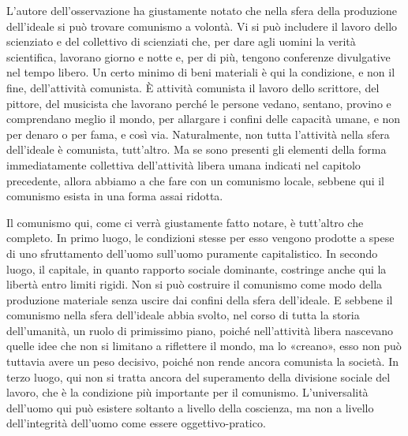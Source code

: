 \documentclass[12pt,a4paper,openany]{book}
\begin{document}
L'autore dell'osservazione ha giustamente notato che nella sfera della produzione dell'ideale si può trovare comunismo a volontà. Vi si può includere il lavoro dello scienziato e del collettivo di scienziati che, per dare agli uomini la verità scientifica, lavorano giorno e notte e, per di più, tengono conferenze divulgative nel tempo libero. Un certo minimo di beni materiali è qui la condizione, e non il fine, dell'attività comunista. È attività comunista il lavoro dello scrittore, del pittore, del musicista che lavorano perché le persone vedano, sentano, provino e comprendano meglio il mondo, per allargare i confini delle capacità umane, e non per denaro o per fama, e così via. Naturalmente, non tutta l'attività nella sfera dell'ideale è comunista, tutt'altro. Ma se sono presenti gli elementi della forma immediatamente collettiva dell'attività libera umana indicati nel capitolo precedente, allora abbiamo a che fare con un comunismo locale, sebbene qui il comunismo esista in una forma assai ridotta.

Il comunismo qui, come ci verrà giustamente fatto notare, è tutt'altro che completo. In primo luogo, le condizioni stesse per esso vengono prodotte a spese di uno sfruttamento dell'uomo sull'uomo puramente capitalistico. In secondo luogo, il capitale, in quanto rapporto sociale dominante, costringe anche qui la libertà entro limiti rigidi. Non si può costruire il comunismo come modo della produzione materiale senza uscire dai confini della sfera dell'ideale. E sebbene il comunismo nella sfera dell'ideale abbia svolto, nel corso di tutta la storia dell'umanità, un ruolo di primissimo piano, poiché nell'attività libera nascevano quelle idee che non si limitano a riflettere il mondo, ma lo «creano», esso non può tuttavia avere un peso decisivo, poiché non rende ancora comunista la società. In terzo luogo, qui non si tratta ancora del superamento della divisione sociale del lavoro, che è la condizione più importante per il comunismo. L'universalità dell'uomo qui può esistere soltanto a livello della coscienza, ma non a livello dell'integrità dell'uomo come essere oggettivo-pratico.
\end{document}
